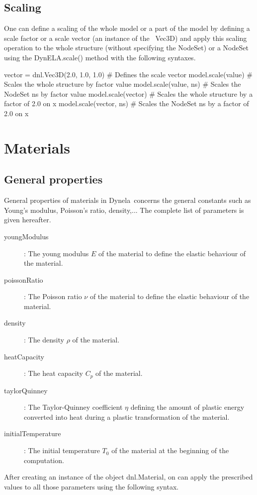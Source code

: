 \subsection{Scaling}

One can define a scaling of the whole model or a part of the model
by defining a scale factor or a scale vector (an instance of the \Dynela~\textsf{Vec3D})
and apply this scaling operation to the whole structure (without specifying
the \textsf{NodeSet}) or a \textsf{NodeSet} using the \textsf{DynELA.scale()}
method with the following syntaxes.

\begin{PythonListing}
vector = dnl.Vec3D(2.0, 1.0, 1.0) # Defines the scale vector
model.scale(value)      # Scales the whole structure by factor value
model.scale(value, ns)  # Scales the NodeSet ns by factor value
model.scale(vector)     # Scales the whole structure by a factor of 2.0 on x
model.scale(vector, ns) # Scales the NodeSet ns by a factor of 2.0 on x
\end{PythonListing}

\section{Materials}

\subsection{General properties}

General properties of materials in Dynela~concerns the general constants
such as Young's modulus, Poisson's ratio, density,... The complete
list of parameters is given hereafter.
\begin{description}
\item [{youngModulus}] : The young modulus $E$ of the material to define
the elastic behaviour of the material.
\item [{poissonRatio}] : The Poisson ratio $\nu$ of the material to define
the elastic behaviour of the material.
\item [{density}] : The density $\rho$ of the material.
\item [{heatCapacity}] : The heat capacity $C_{p}$ of the material.
\item [{taylorQuinney}] : The Taylor-Quinney coefficient $\eta$ defining
the amount of plastic energy converted into heat during a plastic
transformation of the material.
\item [{initialTemperature}] : The initial temperature $T_{0}$ of the
material at the beginning of the computation.
\end{description}
After creating an instance of the object \textsf{dnl.Material}, on
can apply the prescribed values to all those parameters using the
following syntax. 

